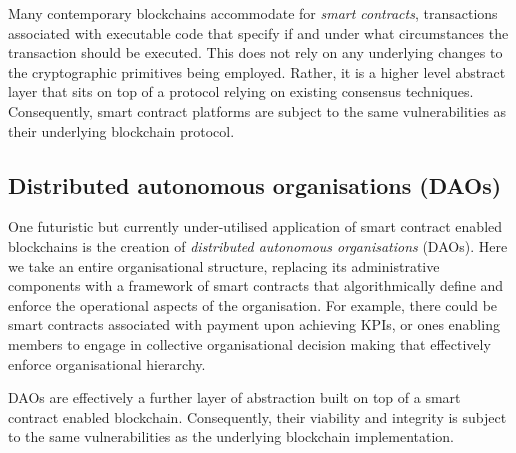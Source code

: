 Many contemporary blockchains accommodate for \emph{smart contracts}, transactions associated with executable code that specify if and under what circumstances the transaction should be executed. This does not rely on any underlying changes to the cryptographic primitives being employed. Rather, it is a higher level abstract layer that sits on top of a protocol relying on existing consensus techniques. Consequently, smart contract platforms are subject to the same vulnerabilities as their underlying blockchain protocol.

\subsection{Distributed autonomous organisations (DAOs)}

One futuristic but currently under-utilised application of smart contract enabled blockchains is the creation of \emph{distributed autonomous organisations} (DAOs). Here we take an entire organisational structure, replacing its administrative components with a framework of smart contracts that algorithmically define and enforce the operational aspects of the organisation. For example, there could be smart contracts associated with payment upon achieving KPIs, or ones enabling members to engage in collective organisational decision making that effectively enforce organisational hierarchy.

DAOs are effectively a further layer of abstraction built on top of a smart contract enabled blockchain. Consequently, their viability and integrity is subject to the same vulnerabilities as the underlying blockchain implementation.